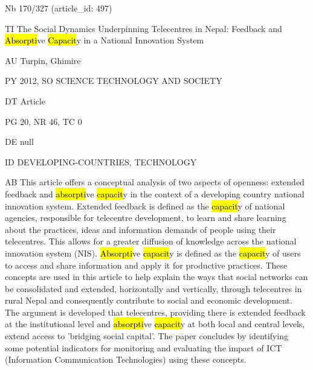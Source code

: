 \documentclass[a4paper]{article}
\begin{document}
\vspace*{-2cm}
Nb \tabto{0cm}170/327 (article\_id: 497)\par
TI \tabto{0cm}The Social Dynamics Underpinning Telecentres in Nepal: Feedback and \hl{Absorpti}ve \hl{Capacit}y in a National Innovation System\par
AU \tabto{0cm}Turpin, Ghimire\par
PY \tabto{0cm}2012, SO SCIENCE TECHNOLOGY AND SOCIETY\par
DT \tabto{0cm}Article\par
PG \tabto{0cm}20, NR 46, TC 0\par
DE \tabto{0cm}null\par
ID \tabto{0cm}DEVELOPING-COUNTRIES, TECHNOLOGY\par
AB \tabto{0cm}This article offers a conceptual analysis of two aspects of openness: extended feedback and \hl{absorpti}ve \hl{capacit}y in the context of a developing country national innovation system. Extended feedback is defined as the \hl{capacit}y of national agencies, responsible for telecentre development, to learn and share learning about the practices, ideas and information demands of people using their telecentres. This allows for a greater diffusion of knowledge across the national innovation system (NIS). \hl{Absorpti}ve \hl{capacit}y is defined as the \hl{capacit}y of users to access and share information and apply it for productive practices. These concepts are used in this article to help explain the ways that social networks can be consolidated and extended, horizontally and vertically, through telecentres in rural Nepal and consequently contribute to social and economic development. The argument is developed that telecentres, providing there is extended feedback at the institutional level and \hl{absorpti}ve \hl{capacit}y at both local and central levels, extend access to 'bridging social capital'. The paper concludes by identifying some potential indicators for monitoring and evaluating the impact of ICT (Information Communication Technologies) using these concepts.\par
\clearpage
\end{document}
